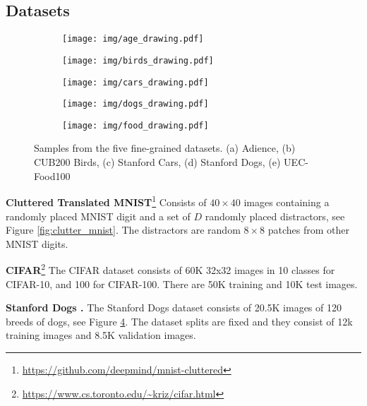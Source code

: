 \documentclass[runningheads]{llncs}
\begin{document}
\subsection{Datasets}
\begin{figure}[t!]
\centering
\begin{subfigure}[t]{0.19\textwidth}
\centering
\texttt{[image: img/age\_drawing.pdf]}
\caption{}
\label{fig:adience_sample}
\end{subfigure}
\begin{subfigure}[t]{0.19\textwidth}
\centering
\texttt{[image: img/birds\_drawing.pdf]}
\caption{}
\label{fig:birds_sample}
\end{subfigure}
\begin{subfigure}[t]{0.19\textwidth}
\centering
\texttt{[image: img/cars\_drawing.pdf]}
\caption{}
\label{fig:cars_sample}
\end{subfigure}
\begin{subfigure}[t]{0.19\textwidth}
\centering
\texttt{[image: img/dogs\_drawing.pdf]}
\caption{}
\label{fig:dogs_sample}
\end{subfigure}
\begin{subfigure}[t]{0.19\textwidth}
\centering
\texttt{[image: img/food\_drawing.pdf]}
\caption{}
\label{fig:food_sample}
\end{subfigure}
\caption{Samples from the five fine-grained datasets. (a) Adience, (b) CUB200 Birds, (c) Stanford Cars, (d) Stanford Dogs, (e) UEC-Food100}
\end{figure}

\noindent\textbf{Cluttered Translated MNIST}\footnote{\url{https://github.com/deepmind/mnist-cluttered}}
Consists of $40\times 40$ images containing a randomly placed MNIST \cite{lecun1998mnist} digit and a set of $D$ randomly placed distractors, see Figure \ref{fig:clutter_mnist}. The distractors are random $8\times 8$ patches from other MNIST digits.

\medskip
\noindent\textbf{CIFAR}\footnote{\url{https://www.cs.toronto.edu/~kriz/cifar.html}}
The CIFAR dataset consists of 60K 32x32 images in 10 classes for CIFAR-10, and 100 for CIFAR-100. There are 50K training and 10K test images. 

\medskip
\noindent\textbf{Stanford Dogs \cite{khosla2011novel}.}
The Stanford Dogs dataset consists of 20.5K images of 120 breeds of dogs, see Figure \ref{fig:dogs_sample}. The dataset splits are fixed and they consist of 12k training images and 8.5K validation images. 
\end{document}
